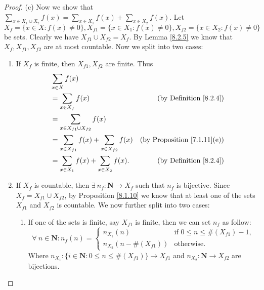 \begin{proof}{(c)}
    Now we show that \(\sum_{x \in X_1 \cup X_2} f(x) = \sum_{x \in X_1} f(x) + \sum_{x \in X_2} f(x)\).
    Let \(X_f = \{x \in X : f(x) \neq 0\}, X_{f1} = \{x \in X_1 : f(x) \neq 0\}, X_{f2} = \{x \in X_2 : f(x) \neq 0\}\) be sets.
    Clearly we have \(X_{f1} \cup X_{f2} = X_f\).
    By Lemma \ref{8.2.5} we know that \(X_f, X_{f1}, X_{f2}\) are at most countable.
    Now we split into two cases:
    \begin{enumerate}[label=(\Roman*)]
        \item If \(X_f\) is finite, then \(X_{f1}, X_{f2}\) are finite.
              Thus
              \begin{align*}
                   & \sum_{x \in X} f(x)                                                                             \\
                   & = \sum_{x \in X_f} f(x)                               & \text{(by Definition \ref{8.2.4})}      \\
                   & = \sum_{x \in X_{f1} \cup X_{f2}} f(x)                                                          \\
                   & = \sum_{x \in X_{f1}} f(x) + \sum_{x \in X_{f2}} f(x) & \text{(by Proposition \ref{7.1.11}(e))} \\
                   & = \sum_{x \in X_1} f(x) + \sum_{x \in X_2} f(x).      & \text{(by Definition \ref{8.2.4})}
              \end{align*}
        \item If \(X_f\) is countable, then \(\exists\ n_f : \mathbf{N} \to X_f\) such that \(n_f\) is bijective.
              Since \(X_f = X_{f1} \cup X_{f2}\), by Proposition \ref{8.1.10} we know that at least one of the sets \(X_{f1}\) and \(X_{f2}\) is countable.
              We now further split into two cases:
              \begin{enumerate}[label=(\roman*)]
                  \item If one of the sets is finite, say \(X_{f1}\) is finite, then we can set \(n_f\) as follow:
                        \[
                            \forall\ n \in \mathbf{N} : n_f(n) = \begin{cases}
                                n_{X_1}(n)              & \text{if } 0 \leq n \leq \#(X_{f1}) - 1, \\
                                n_{X_2}(n - \#(X_{f1})) & \text{otherwise}.
                            \end{cases}
                        \]
                        Where \(n_{X_1} : \{i \in \mathbf{N} : 0 \leq n \leq \#(X_{f1})\} \to X_{f1}\) and \(n_{X_2} : \mathbf{N} \to X_{f2}\) are bijections.

\end{enumerate}
\end{enumerate}
\end{proof}
